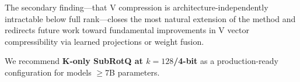 \documentclass{article}
\begin{document}
The secondary finding---that V compression is architecture-independently
intractable below full rank---closes the most natural extension of the method and
redirects future work toward fundamental improvements in V vector compressibility
via learned projections or weight fusion.

We recommend \textbf{K-only SubRotQ at $k{=}128$/4-bit} as a production-ready
configuration for models $\geq$7B parameters.



\end{document}
